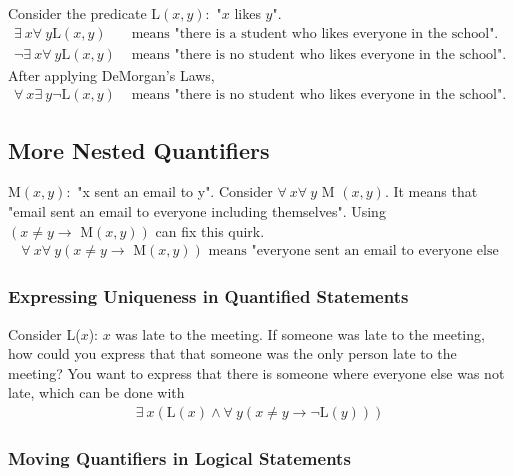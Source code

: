 \noindent Consider the predicate L$(x,y):$ "$x$ likes $y$".
\begin{align*}
  \exists~ x \forall~ y \text{L}(x, y)       & \text{ means "there is a student who likes everyone in the school".}  \\
  \lnot \exists~ x \forall~ y \text{L}(x, y) & \text{ means "there is no student who likes everyone in the school".}
\end{align*}
After applying DeMorgan's Laws,
\begin{align*}
  \forall~ x \exists~ y \lnot \text{L}(x, y) & \text{ means "there is no student who likes everyone in the school".}
\end{align*}

\subsection{More Nested Quantifiers}

M$(x, y):$ "x sent an email to y". Consider $\forall~ x \forall~ y$ M $(x, y)$.
It means that "email sent an email to everyone including themselves".
Using $( x \not = y \rightarrow \text{ M}(x, y))$ can fix this quirk.
\begin{align*}
  \forall~ x \forall~ y (x \not = y \rightarrow \text{ M}(x, y))
  \text{ means "everyone sent an email to everyone else}
\end{align*}

\subsubsection*{Expressing Uniqueness in Quantified Statements}

Consider L($x$): $x$ was late to the meeting. If someone was late to the meeting,
how could you express that that someone was the only person late to the meeting?
You want to express that there is someone where everyone else was not late, which
can be done with
\begin{align*}
  \exists~ x (\text{L}(x) \land \forall~ y (x \not = y \rightarrow \lnot \text{L}(y)))
\end{align*}

\subsubsection*{Moving Quantifiers in Logical Statements}

